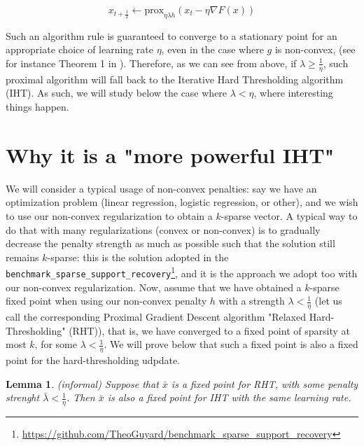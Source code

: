 \documentclass{article}
\newtheorem{lemma}{Lemma}
\begin{document}
$$x_{t+\frac{1}{2}} \leftarrow \text{prox}_{\eta \lambda h}(x_t - \eta \nabla F (x))$$

Such an algorithm rule is guaranteed to converge to a stationary point for an appropriate choice of learning rate $\eta$, even in the case where $g$ is non-convex, (see for instance Theorem 1 in \cite{xu2019non}). Therefore, as we can see from above, if $\lambda \geq \frac{1}{\eta}$, such proximal algorithm will fall back to the Iterative Hard Thresholding algorithm (IHT). As such, we will study below the case where $\lambda < \eta$, where interesting things happen.

\section{Why it is a "more powerful IHT"}


We will consider a typical usage of non-convex penalties: say we have an optimization problem (linear regression, logistic regression, or other), and we wish to use our non-convex regularization to obtain a $k$-sparse vector. A typical way to do that with many regularizations (convex or non-convex) is to gradually decrease the penalty strength as much as possible such that the solution still remains $k$-sparse: this is the solution adopted in the \texttt{benchmark\_sparse\_support\_recovery}\footnote{\url{https://github.com/TheoGuyard/benchmark_sparse_support_recovery}}, and it is the approach we adopt too with our non-convex regularization.  Now, assume that we have obtained a $k$-sparse fixed point when using our non-convex penalty $h$ with a strength $\lambda < \frac{1}{\eta}$ (let us call the corresponding Proximal Gradient Descent algorithm "Relaxed Hard-Thresholding" (RHT)), that is, we have converged to a fixed point of sparsity at most $k$, for some $\lambda < \frac{1}{\eta}$. We will prove below that such a fixed point is also a fixed point for the hard-thresholding udpdate. 


\begin{lemma}(informal)
Suppose that $\bar{x}$ is a fixed point for RHT, with some penalty strenght $\bar{\lambda} < \frac{1}{\eta}$. Then $\bar{x}$ is also a fixed point for IHT with the same learning rate.
\end{lemma}
\end{document}
